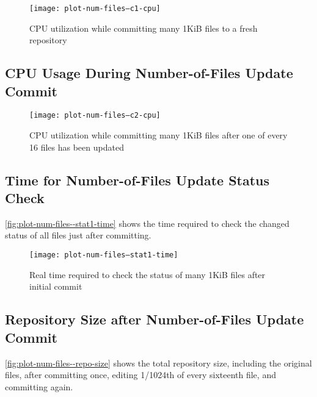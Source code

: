 \begin{figure}[p]
  \caption{CPU utilization while committing many 1KiB files to a fresh
  repository}
  \label{fig:plot-num-files--c1-cpu}
  \centering
    \texttt{[image: plot-num-files--c1-cpu]}
\end{figure}

%


\subsection{CPU Usage During Number-of-Files Update Commit}


\begin{figure}[p]
    \caption{CPU utilization while committing many 1KiB files after one of every
        \num{16} files has been updated}
  \label{fig:plot-num-files--c2-cpu}
  \centering
    \texttt{[image: plot-num-files--c2-cpu]}
\end{figure}

%


\subsection{Time for Number-of-Files Update Status Check}

\autoref{fig:plot-num-files--stat1-time} shows the time
required to check the changed status of all files just after committing.


\begin{figure}[p]
  \caption{Real time required to check the status of many 1KiB files after
  initial commit}
  \label{fig:plot-num-files--stat1-time}
  \centering
    \texttt{[image: plot-num-files--stat1-time]}
\end{figure}

%


\subsection{Repository Size after Number-of-Files Update Commit}

\autoref{fig:plot-num-files--repo-size} shows the total
repository size, including the original files, after committing once, editing
1/1024th of every sixteenth file, and committing again.


